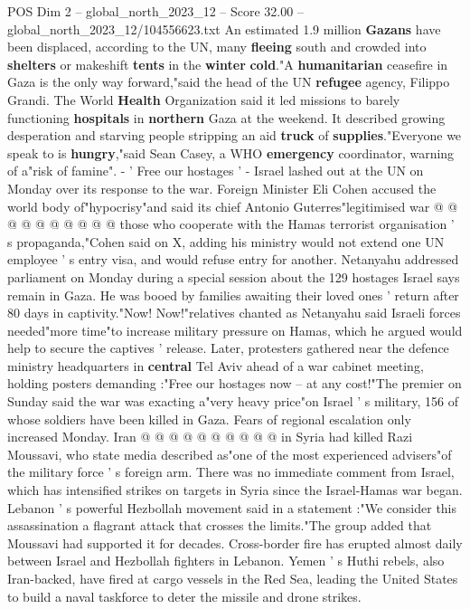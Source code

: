 \begin{textsample}{POS Dim 2 – global\_north\_2023\_12 – Score 32.00 – global\_north\_2023\_12/104556623.txt}
An estimated 1.9 million \textbf{Gazans} have been displaced, according to the UN, many \textbf{fleeing} south and crowded into \textbf{shelters} or makeshift \textbf{tents} in the \textbf{winter} \textbf{cold}."A \textbf{humanitarian} ceasefire in Gaza is the only way forward,"said the head of the UN \textbf{refugee} agency, Filippo Grandi.
The World \textbf{Health} Organization said it led missions to barely functioning \textbf{hospitals} in \textbf{northern} Gaza at the weekend.
It described growing desperation and starving people stripping an aid \textbf{truck} of \textbf{supplies}."Everyone we speak to is \textbf{hungry},"said Sean Casey, a WHO \textbf{emergency} coordinator, warning of a"risk of famine". - ' Free our hostages ' - Israel lashed out at the UN on Monday over its response to the war.
Foreign Minister Eli Cohen accused the world body of"hypocrisy"and said its chief Antonio Guterres"legitimised war @ @ @ @ @ @ @ @ @ @ those who cooperate with the Hamas terrorist organisation ' s propaganda,"Cohen said on X, adding his ministry would not extend one UN employee ' s entry visa, and would refuse entry for another.
Netanyahu addressed parliament on Monday during a special session about the 129 hostages Israel says remain in Gaza.
He was booed by families awaiting their loved ones ' return after 80 days in captivity."Now!
Now!"relatives chanted as Netanyahu said Israeli forces needed"more time"to increase military pressure on Hamas, which he argued would help to secure the captives ' release.
Later, protesters gathered near the defence ministry headquarters in \textbf{central} Tel Aviv ahead of a war cabinet meeting, holding posters demanding :"Free our hostages now -- at any cost!"The premier on Sunday said the war was exacting a"very heavy price"on Israel ' s military, 156 of whose soldiers have been killed in Gaza.
Fears of regional escalation only increased Monday.
Iran @ @ @ @ @ @ @ @ @ @ in Syria had killed Razi Moussavi, who state media described as"one of the most experienced advisers"of the military force ' s foreign arm.
There was no immediate comment from Israel, which has intensified strikes on targets in Syria since the Israel-Hamas war began.
Lebanon ' s powerful Hezbollah movement said in a statement :"We consider this assassination a flagrant attack that crosses the limits."The group added that Moussavi had supported it for decades.
Cross-border fire has erupted almost daily between Israel and Hezbollah fighters in Lebanon.
Yemen ' s Huthi rebels, also Iran-backed, have fired at cargo vessels in the Red Sea, leading the United States to build a naval taskforce to deter the missile and drone strikes.

\end{textsample}
